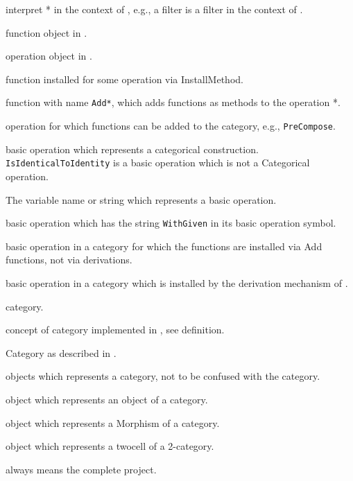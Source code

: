 
\begin{itemize}
 
 \itembold{\GAP *} interpret * in the context of \GAP, e.g., a \GAP filter is
   a filter in the context of \GAP.
 
  function object in \GAP.
 
  operation object in \GAP.
 
  function installed for some operation via InstallMethod.
 
  function with name \texttt{Add*}, which adds functions as methods
   to the operation *.
 
  operation for which functions can be added to the category, e.g., \texttt{PreCompose}.
 
  basic operation which represents a categorical construction. \texttt{IsIdenticalToIdentity}
   is a basic operation which is not a Categorical operation.
 
  The variable name or string which represents a basic operation.
 
  basic operation which has the string \texttt{WithGiven} in its basic operation symbol.
 
  basic operation in a category for which the functions are installed via Add functions, not via
   derivations.
 
  basic operation in a category which is installed by the derivation mechanism of \CapPkg.
 
  \CapPkg category.
 
  concept of category implemented in \CapPkg, see definition.
 
  Category as described in \cite{MLCWM}.
 
  \GAP objects which represents a \CapPkg category, not to be confused with the \GAP category.
 
  \GAP object which represents an object of a category.
 
  \GAP object which represents a Morphism of a category.
 
  \GAP object which represents a twocell of a 2-category.
 
 \itembold{\CapPkg} always means the complete \CapPkg project.
 
\end{itemize}
